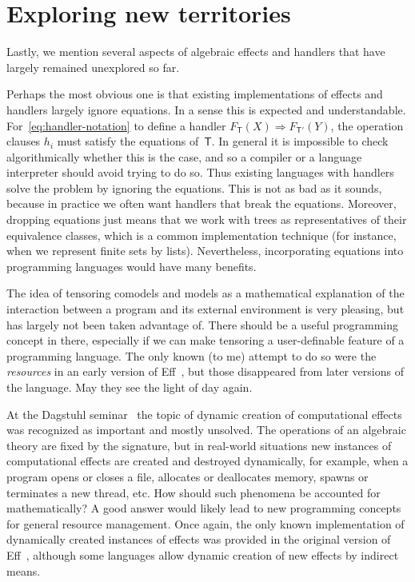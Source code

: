 \documentclass{amsart}
\newcommand{\theory}[1]{\mathsf{#1}} %
\newcommand{\Free}[2]{F_{\theory{#1}}(#2)} %
\newcommand{\hto}{\Rightarrow} %
\begin{document}
\section{Exploring new territories}
\label{sec:expl-new-terr}

Lastly, we mention several aspects of algebraic effects and handlers that have
largely remained unexplored so far.

Perhaps the most obvious one is that existing implementations of effects and
handlers largely ignore equations. In a sense this is expected and
understandable. For~\eqref{eq:handler-notation} to define a handler
$\Free{T}{X} \hto \Free{T'}{Y}$, the operation clauses $h_i$ must satisfy the
equations of~$\theory{T}$. In general it is impossible to check algorithmically
whether this is the case, and so a compiler or a language interpreter should
avoid trying to do so. Thus existing languages with handlers solve the problem
by ignoring the equations. This is not as bad as it sounds, because in practice
we often want handlers that break the equations. Moreover, dropping equations
just means that we work with trees as representatives of their equivalence
classes, which is a common implementation technique (for instance, when we
represent finite sets by lists). Nevertheless, incorporating equations into
programming languages would have many benefits.

The idea of tensoring comodels and models as a mathematical explanation of the
interaction between a program and its external environment is very pleasing, but
has largely not been taken advantage of. There should be a useful programming
concept in there, especially if we can make tensoring a user-definable feature
of a programming language. The only known (to me) attempt to do so were the
\emph{resources} in an early version of Eff~\cite{bauer15:_progr}, but those
disappeared from later versions of the language. May they see the light of day
again.

At the Dagstuhl seminar~\cite{chandrasekaran18:_algeb} the topic of dynamic
creation of computational effects was recognized as important and mostly
unsolved. The operations of an algebraic theory are fixed by the signature, but
in real-world situations new instances of computational effects are created and
destroyed dynamically, for example, when a program opens or closes a file,
allocates or deallocates memory, spawns or terminates a new thread, etc. How
should such phenomena be accounted for mathematically? A good answer would
likely lead to new programming concepts for general resource management. Once
again, the only known implementation of dynamically created instances of effects
was provided in the original version of Eff~\cite{bauer15:_progr}, although some
languages allow dynamic creation of new effects by indirect means.




\end{document}
